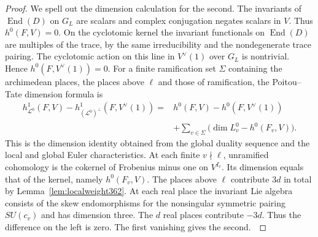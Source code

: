 \documentclass[a4paper,11pt]{article}
\theoremstyle{definition}
\theoremstyle{remark}
\numberwithin{equation}{section}
\begin{document}
\begin{proof}
We spell out the dimension calculation for the second.
The invariants of \(\operatorname{End}(D)\) on \(G_L\) are
scalars and complex conjugation negates scalars in \(V\).
Thus \(h^0(F,V)=0\). On the cyclotomic kernel the invariant
functionals on \(\operatorname{End}(D)\) are multiples of the
trace, by the same irreducibility and the nondegenerate trace
pairing. The cyclotomic action on this line in \(V^\vee(1)\)
over \(G_L\) is nontrivial. Hence \(h^0(F,V^\vee(1))=0\).
For a finite ramification set \(\Sigma\) containing the
archimedean places, the places above \(\ell\) and those of
ramification, the Poitou--Tate dimension formula is
\[
 \begin{split}
 h^1_{\mathcal L^0}(F,V)-h^1_{(\mathcal L^0)^\perp}(F,V^\vee(1))
 ={}&h^0(F,V)-h^0(F,V^\vee(1))\\
    &+\sum_{v\in\Sigma}\bigl(\dim L_v^0-h^0(F_v,V)\bigr).
 \end{split}
\]
This is the dimension identity obtained from the global duality
sequence and the local and global Euler characteristics. At each
finite \(v\nmid\ell\), unramified cohomology is the cokernel of
Frobenius minus one on \(V^{I_v}\). Its dimension equals that
of the kernel, namely \(h^0(F_v,V)\). The places above \(\ell\)
contribute \(3d\) in total by Lemma~\ref{lem:localweight362}.
At each real place the invariant Lie algebra consists of the
skew endomorphisms for the nonsingular symmetric pairing
\(S U(c_v)\) and has dimension three. The \(d\) real places
contribute \(-3d\). Thus the difference on the left is zero.
The first vanishing gives the second.~\cite{VII-V-V-milne98}
\end{proof}
\end{document}
